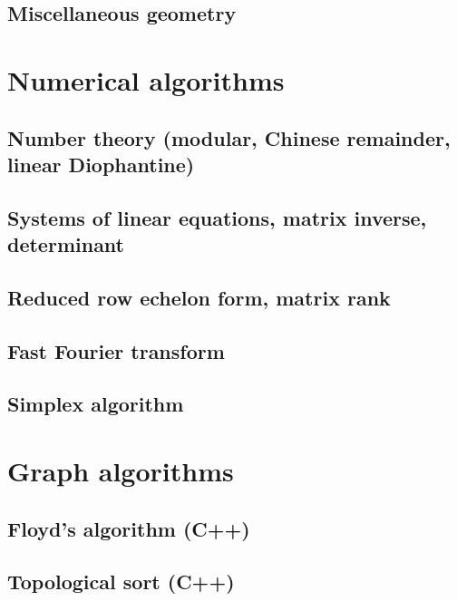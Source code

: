 \subsection{Miscellaneous geometry}
\raggedbottom
\hrulefill

\section{Numerical algorithms}
\subsection{Number theory (modular, Chinese remainder, linear Diophantine)}
\raggedbottom
\hrulefill
\subsection{Systems of linear equations, matrix inverse, determinant}
\raggedbottom
\hrulefill
\subsection{Reduced row echelon form, matrix rank}
\raggedbottom
\hrulefill
\subsection{Fast Fourier transform}
\raggedbottom
\hrulefill
\subsection{Simplex algorithm}
\raggedbottom
\hrulefill

\section{Graph algorithms}
\subsection{Floyd's algorithm (C++)}
\raggedbottom
\hrulefill
\subsection{Topological sort (C++)}
\raggedbottom
\hrulefill
